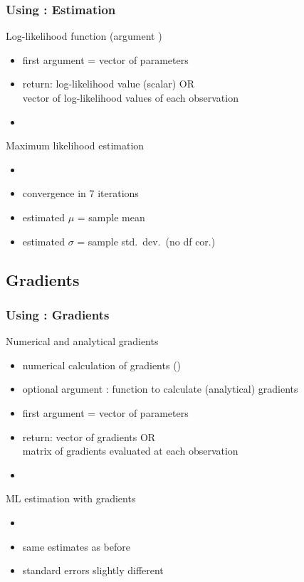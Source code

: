 \documentclass{beamer}
\begin{document}
\begin{frame}
\frametitle{Using : Estimation}
Log-likelihood function (argument )
\begin{itemize}
\item first argument = vector of parameters
\item return: log-likelihood value (scalar) OR\\
   vector of log-likelihood values of each observation
\item {}
\end{itemize}
\vspace*{2ex}
Maximum likelihood estimation
\begin{itemize}
\item {}
\item convergence in 7 iterations
\item estimated $\mu$ = sample mean
\item estimated $\sigma$ = sample std.\ dev.\ (no df cor.)
\end{itemize}
\end{frame}

\subsection{Gradients}
\begin{frame}
\frametitle{Using : Gradients}
Numerical and analytical gradients
\begin{itemize}
\item numerical calculation of gradients
   ()
\item optional argument :
   function to calculate (analytical) gradients
\item first argument = vector of parameters
\item return: vector of gradients OR\\
   matrix of gradients evaluated at each observation
\item {}
\end{itemize}
\vspace*{2ex}
ML estimation with gradients
\begin{itemize}
\item {}
\item same estimates as before
\item standard errors slightly different
\end{itemize}
\end{frame}
\end{document}
